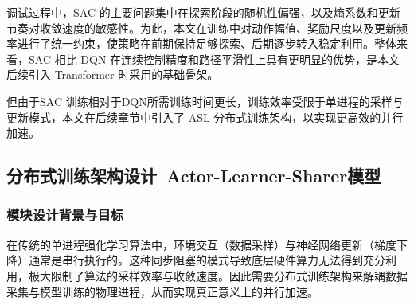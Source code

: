 \documentclass[
  oneside,
  degree=bachelor,
  fullwidthstop=false,
  fontset=fandol,
  times=false,
  minted=true,
  biblatex=true,
]{tongjithesis}
\begin{document}
调试过程中，SAC 的主要问题集中在探索阶段的随机性偏强，以及熵系数和更新节奏对收敛速度的敏感性。为此，本文在训练中对动作幅值、奖励尺度以及更新频率进行了统一约束，使策略在前期保持足够探索、后期逐步转入稳定利用。整体来看，SAC 相比 DQN 在连续控制精度和路径平滑性上具有更明显的优势，是本文后续引入 Transformer 时采用的基础骨架。

但由于SAC 训练相对于DQN所需训练时间更长，训练效率受限于单进程的采样与更新模式，本文在后续章节中引入了 ASL 分布式训练架构，以实现更高效的并行加速。

\subsection{分布式训练架构设计--Actor-Learner-Sharer模型}
\label{sec:shared_data_module}

\subsubsection{模块设计背景与目标}

在传统的单进程强化学习算法中，环境交互（数据采样）与神经网络更新（梯度下降）通常是串行执行的。这种同步阻塞的模式导致底层硬件算力无法得到充分利用，极大限制了算法的采样效率与收敛速度。因此需要分布式训练架构来解耦数据采集与模型训练的物理进程，从而实现真正意义上的并行加速。
\end{document}
